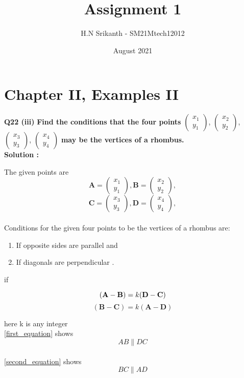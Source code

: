 \documentclass{article}
\title{\textbf{\Huge Assignment 1}}
\author{\large H.N Srikanth - SM21Mtech12012}
\date{August 2021}
\begin{document}
\providecommand{\mbf}{\mathbf}

\newcommand{\myvec}[1]{\ensuremath{\begin{pmatrix}#1\end{pmatrix}}}
\let\vec\mathbf

\maketitle

\section*{Chapter II, Examples II}
\textbf{Q22 (iii)}
\textbf{Find the conditions that the four points}
\myvec{x_1\\y_1}, \myvec{x_2\\y_2},
\myvec{x_3\\y_3}, \myvec{x_4\\y_4}
\textbf{ may be the vertices of a rhombus.}\\

\textbf{Solution :}

The given points are\\

$$\vec{A} = \myvec{x_1\\y_1}, \vec{B} =\myvec{x_2\\y_2},$$
$$\vec{C} =\myvec{x_3\\y_3}, \vec{D} =\myvec{x_4\\y_4},$$\\
Conditions for the given four points to be the vertices of a rhombus are:
\begin{enumerate}
  \item If opposite sides are parallel and
  \item If diagonals are perpendicular .
\end{enumerate}
if

\begin{equation}\label{first_equation}
(\vec{A}-\vec{B} ) = k(\vec{D}-\vec{C} )\\
\end{equation}
\begin{equation}\label{second_equation}
(\vec{B}-\vec{C} )=k(\vec{A}-\vec{D} )
\end{equation}

here k is any integer\\
\ref{first_equation} shows 
$$AB \parallel DC $$\\
\ref{second_equation} shows 
$$BC \parallel AD$$
\end{document}
